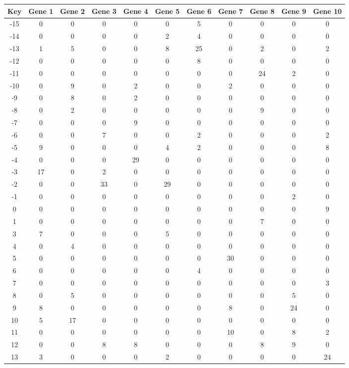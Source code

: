 \begin{tabular}{|c|c|c|c|c|c|c|c|c|c|c|}
\hline
Key & Gene 1 & Gene 2 & Gene 3 & Gene 4 & Gene 5 & Gene 6 & Gene 7 & Gene 8 & Gene 9 & Gene 10 \\
\hline
-15 & 0 & 0 & 0 & 0 & 0 & 5 & 0 & 0 & 0 & 0 \\
-14 & 0 & 0 & 0 & 0 & 2 & 4 & 0 & 0 & 0 & 0 \\
-13 & 1 & 5 & 0 & 0 & 8 & 25 & 0 & 2 & 0 & 2 \\
-12 & 0 & 0 & 0 & 0 & 0 & 8 & 0 & 0 & 0 & 0 \\
-11 & 0 & 0 & 0 & 0 & 0 & 0 & 0 & 24 & 2 & 0 \\
-10 & 0 & 9 & 0 & 2 & 0 & 0 & 2 & 0 & 0 & 0 \\
-9 & 0 & 8 & 0 & 2 & 0 & 0 & 0 & 0 & 0 & 0 \\
-8 & 0 & 2 & 0 & 0 & 0 & 0 & 0 & 9 & 0 & 0 \\
-7 & 0 & 0 & 0 & 9 & 0 & 0 & 0 & 0 & 0 & 0 \\
-6 & 0 & 0 & 7 & 0 & 0 & 2 & 0 & 0 & 0 & 2 \\
-5 & 9 & 0 & 0 & 0 & 4 & 2 & 0 & 0 & 0 & 8 \\
-4 & 0 & 0 & 0 & 29 & 0 & 0 & 0 & 0 & 0 & 0 \\
-3 & 17 & 0 & 2 & 0 & 0 & 0 & 0 & 0 & 0 & 0 \\
-2 & 0 & 0 & 33 & 0 & 29 & 0 & 0 & 0 & 0 & 0 \\
-1 & 0 & 0 & 0 & 0 & 0 & 0 & 0 & 0 & 2 & 0 \\
0 & 0 & 0 & 0 & 0 & 0 & 0 & 0 & 0 & 0 & 9 \\
1 & 0 & 0 & 0 & 0 & 0 & 0 & 0 & 7 & 0 & 0 \\
3 & 7 & 0 & 0 & 0 & 5 & 0 & 0 & 0 & 0 & 0 \\
4 & 0 & 4 & 0 & 0 & 0 & 0 & 0 & 0 & 0 & 0 \\
5 & 0 & 0 & 0 & 0 & 0 & 0 & 30 & 0 & 0 & 0 \\
6 & 0 & 0 & 0 & 0 & 0 & 4 & 0 & 0 & 0 & 0 \\
7 & 0 & 0 & 0 & 0 & 0 & 0 & 0 & 0 & 0 & 3 \\
8 & 0 & 5 & 0 & 0 & 0 & 0 & 0 & 0 & 5 & 0 \\
9 & 8 & 0 & 0 & 0 & 0 & 0 & 8 & 0 & 24 & 0 \\
10 & 5 & 17 & 0 & 0 & 0 & 0 & 0 & 0 & 0 & 0 \\
11 & 0 & 0 & 0 & 0 & 0 & 0 & 10 & 0 & 8 & 2 \\
12 & 0 & 0 & 8 & 8 & 0 & 0 & 0 & 8 & 9 & 0 \\
13 & 3 & 0 & 0 & 0 & 2 & 0 & 0 & 0 & 0 & 24 \\
\hline
\end{tabular}